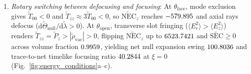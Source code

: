 \documentclass[aps,prd,twocolumn,10pt,showkeys,nofootinbib,floatfix,longbibliography]{revtex4-2}
\newcommand{\dd}{\mathrm{d}}
\begin{document}
\begin{enumerate}
\item \emph{Rotary switching between defocusing and focusing}: At $\theta_{\mathrm{face}}$, mode exclusion gives $\tilde{T}_{00} < 0$ and $\tilde{T}_{zz} \approx 3\tilde{T}_{00} < 0$, so $\widetilde{\mathrm{NEC}}_z$ reaches $-579.895$ and axial rays defocus ($\dd\tilde{\Theta}_{\mathrm{null}}/\dd\tilde{\lambda} > 0$). At $\theta_{\mathrm{open}}$, transverse slot fringing ($\langle E_r^2\rangle > \langle E_z^2\rangle$) renders $\tilde{T}_{zz} = \tilde{P}_z > |\tilde{\rho}_{\mathrm{vac}}| > 0$, flipping $\widetilde{\mathrm{NEC}}_z$ up to $6523.7421$ and $\widetilde{\mathrm{SEC}} \ge 0$ across volume fraction $0.9959$, yielding net null expansion swing $100.8036$ and trace-to-net timelike focusing ratio $40.2844$ at $\xi=0$ (Fig.~\ref{fig:energy_conditions}a--c).


\end{enumerate}
\end{document}
